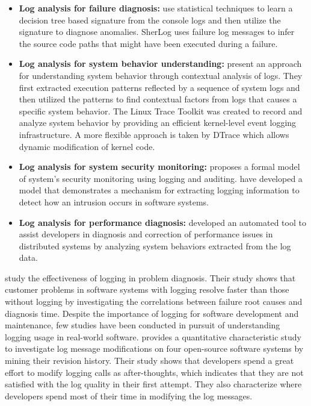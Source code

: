 \begin{itemize} [leftmargin=0.7in]
\item \textbf{Log analysis for failure diagnosis: }\citet{xu2009detecting} use statistical techniques to learn a decision tree based signature from the console logs and then utilize the signature to diagnose anomalies. SherLog \cite{yuan2010sherlog} uses failure log messages to infer the source code paths that might have been executed during a failure.
\item \textbf{Log analysis for system behavior understanding: }\citet{fu2013contextual} present an approach for understanding system behavior through contextual analysis of logs. They first extracted execution patterns reflected by a sequence of system logs and then utilized the patterns to find contextual factors from logs that causes a specific system behavior. The Linux Trace Toolkit \cite{yaghmour2000measuringandcharacter} was created to record and analyze system behavior by providing an efficient kernel-level event logging infrastructure. A more flexible approach is taken by DTrace \cite{cantrill2004dynamic} which allows dynamic modification of kernel code.
\item \textbf{Log analysis for system security monitoring: }\citet{bishop1989model} proposes a formal model of system's security monitoring using logging and auditing. \citet{peisert2007toward} have developed a model that demonstrates a mechanism for extracting logging information to detect how an intrusion occurs in software systems.%
\item \textbf{Log analysis for performance diagnosis: }\citet{nagaraj2012structured} developed an automated tool to assist developers in diagnosis and correction of performance issues in distributed systems by analyzing system behaviors extracted from the log data.
\end{itemize}

\citet{jiang2009understanding} study the effectiveness of logging in problem diagnosis. Their study shows that customer problems in software systems with logging resolve faster than those without logging by investigating the correlations between failure root causes and diagnosis time. Despite the importance of logging for software development and maintenance, few studies have been conducted in pursuit of understanding logging usage in real-world software. \citet{yuan2012characterizing} provides a quantitative characteristic study to investigate log message modifications on four open-source software systems by mining their revision history. Their study shows that developers spend a great effort to modify logging calls as after-thoughts, which indicates that they are not satisfied with the log quality in their first attempt. They also characterize where developers spend most of their time in modifying the log messages.

